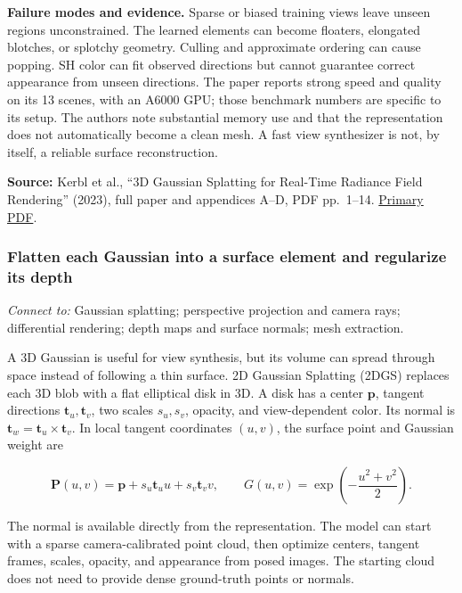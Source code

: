 \textbf{Failure modes and evidence.} Sparse or biased training views leave unseen regions unconstrained. The learned elements can become floaters, elongated blotches, or splotchy geometry. Culling and approximate ordering can cause popping. SH color can fit observed directions but cannot guarantee correct appearance from unseen directions. The paper reports strong speed and quality on its 13 scenes, with an A6000 GPU; those benchmark numbers are specific to its setup. The authors note substantial memory use and that the representation does not automatically become a clean mesh. A fast view synthesizer is not, by itself, a reliable surface reconstruction.

\textbf{Source:} Kerbl et al., ``3D Gaussian Splatting for Real-Time Radiance Field Rendering'' (2023), full paper and appendices A--D, PDF pp.~1--14. \href{https://repo-sam.inria.fr/fungraph/3d-gaussian-splatting/3d_gaussian_splatting_low.pdf}{Primary PDF}.

\subsubsection{Flatten each Gaussian into a surface element and regularize its depth}\label{04-visual-computing-ii-ch034-flatten-each-gaussian-into-a-surface-element-and-regularize-its-depth}

\hypertarget{04-visual-computing-ii-ch034-flatten-each-gaussian-into-a-surface-element-and-regularize-its-depth}{}

\emph{Connect to:} Gaussian splatting; perspective projection and camera rays; differential rendering; depth maps and surface normals; mesh extraction.

A 3D Gaussian is useful for view synthesis, but its volume can spread through space instead of following a thin surface. 2D Gaussian Splatting (2DGS) replaces each 3D blob with a flat elliptical disk in 3D. A disk has a center \(\mathbf{p}\), tangent directions \(\mathbf{t}_u,\mathbf{t}_v\), two scales \(s_u,s_v\), opacity, and view-dependent color. Its normal is \(\mathbf{t}_w=\mathbf{t}_u\times\mathbf{t}_v\). In local tangent coordinates \((u,v)\), the surface point and Gaussian weight are

\[\mathbf{P}(u,v)=\mathbf{p}+s_u\mathbf{t}_u u+s_v\mathbf{t}_v v,\qquad G(u,v)=\exp\left(-\frac{u^2+v^2}{2}\right).\]

The normal is available directly from the representation. The model can start with a sparse camera-calibrated point cloud, then optimize centers, tangent frames, scales, opacity, and appearance from posed images. The starting cloud does not need to provide dense ground-truth points or normals.

